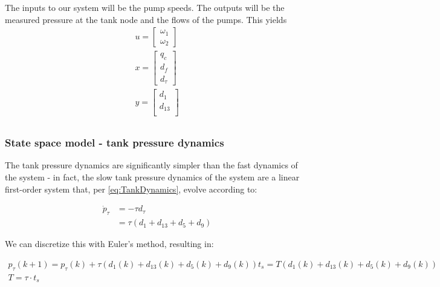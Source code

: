 The inputs to our system will be the pump speeds. 
The outputs will be the measured pressure at the tank node and the flows of the pumps. This yields
\begin{equation}\label{eq:StateSpaceInputsOutputsFast}
	\begin{split}
		u = \begin{bmatrix} \omega_1 \\ \omega_2	\end{bmatrix} \\
		x = \begin{bmatrix} q_c \\ d_f \\ d_{\tau}	\end{bmatrix} \\
		y = \begin{bmatrix} d_1 \\ d_{13} \\ 	\end{bmatrix} \\
	\end{split}
\end{equation}

\subsubsection{State space model - tank pressure dynamics}
The tank pressure dynamics are significantly simpler than the fast dynamics of the system - in fact, the slow tank pressure dynamics of the system are a linear first-order system that, per \cref{eq:TankDynamics}, evolve according to:

\begin{equation}\label{eq:SlowTankDynamics}
	\begin{split}
		\dot{p}_\tau &= - \tau d_\tau \\
		&= \tau \left(d_1 + d_{13} + d_5 + d_9\right)
	\end{split}
\end{equation}

We can discretize this with Euler's method, resulting in:

\begin{equation}\label{eq:TankDynamicsDiscrete}
	\begin{gathered}
			p_\tau(k+1) = p_\tau(k) + \tau \left(d_1(k) + d_{13}(k) + d_5(k) + d_9(k)\right)t_s = T\left(d_1(k) + d_{13}(k) + d_5(k) + d_9(k)\right) \\ 
			T = \tau\cdot t_s 
	\end{gathered}
\end{equation}

